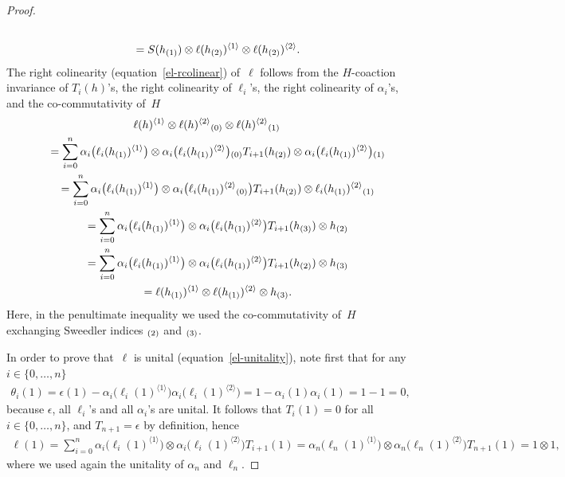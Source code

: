 \documentclass[pdftex]{sigma}
\def\sw#1{{\sb{(#1)}}}
\newcommand{\ls}[1]{\ell(#1)^{\langle 1\rangle}}
\newcommand{\rs}[1]{\ell(#1)^{\langle 2\rangle}}
\newcommand{\lls}[2]{\ell_{#1}(#2)^{\langle 1\rangle}}
\newcommand{\rrs}[2]{\ell_{#1}(#2)^{\langle 2\rangle}}
\begin{document}
\begin{proof}
\begin{gather*}
\\
\qquad=
S(h\sw{1})\otimes\ls{h\sw{2}}\otimes\rs{h\sw{2}}.
\end{gather*}
The right colinearity %
(equation~\eqref{el-rcolinear}) of~$\ell$ follows from the $H$-coaction invariance of $T_i(h)$'s,
the right colinearity of $\ell_i$'s, the right colinearity of $\alpha_i$'s, and the co-commutativity of~$H$
\begin{gather*}
\ls{h}\otimes\rs{h}\sw{0}\otimes\rs{h}\sw{1}
\\
\qquad=
\sum\limits_{i=0}^n\alpha_i\big(\lls{i}{h\sw{1}}\big)\otimes
\alpha_i\big(\rrs{i}{h\sw{1}}\big)\sw{0}T_{i+1}(h\sw{2})\otimes\alpha_i\big(\rrs{i}{h\sw{1}}\big)\sw{1}
\\
\qquad=
\sum\limits_{i=0}^n\alpha_i\big(\lls{i}{h\sw{1}}\big)\otimes
\alpha_i\big(\rrs{i}{h\sw{1}}\sw{0}\big)T_{i+1}(h\sw{2})\otimes\rrs{i}{h\sw{1}}\sw{1}
\\
\qquad=
\sum\limits_{i=0}^n\alpha_i\big(\lls{i}{h\sw{1}}\big)\otimes \alpha_i\big(\rrs{i}{h\sw{1}}\big)T_{i+1}(h\sw{3})\otimes h\sw{2}
\\
\qquad=
\sum\limits_{i=0}^n\alpha_i\big(\lls{i}{h\sw{1}}\big)\otimes \alpha_i\big(\rrs{i}{h\sw{1}}\big)T_{i+1}(h\sw{2})\otimes h\sw{3}
\\
\qquad=
\ls{h\sw{1}}\otimes\rs{h\sw{1}}\otimes h\sw{3}.
\end{gather*}
Here, in the penultimate inequality we used the co-commutativity of~$H$ exchanging Sweedler indices $\sw{2}$ and $\sw{3}$.

In order to prove that~$\ell$ is unital (equation~\eqref{el-unitality}), note f\/irst that for any $i\in\{0,\ldots,n\}$
\begin{gather*}
\theta_i(1)={\epsilon}(1)-\alpha_i\big(\lls{i}{1}\big)\alpha_{i}\big(\rrs{i}{1}\big)=1-\alpha_i(1)\alpha_i(1)=1-1=0,
\end{gather*}
because ${\epsilon}$, all $\ell_i$'s and all $\alpha_i$'s are unital.
It follows that $T_i(1)=0$ for all $i\in\{0,\ldots,n\}$, and $T_{n+1}={\epsilon}$ by def\/inition, hence
\begin{gather*}
\ell(1)=\sum\limits_{i=0}^n\!\alpha_i\big(\lls{i}{1}\big)\otimes\alpha_i\big(\rrs{i}{1}\big)T_{i+1}(1)
=\alpha_n\big(\lls{n}{1}\big)\otimes\alpha_n\big(\rrs{n}{1}\big)T_{n+1}(1)=1\otimes1,
\end{gather*}
where we used again the unitality of $\alpha_n$ and $\ell_n$.


\end{proof}
\end{document}
